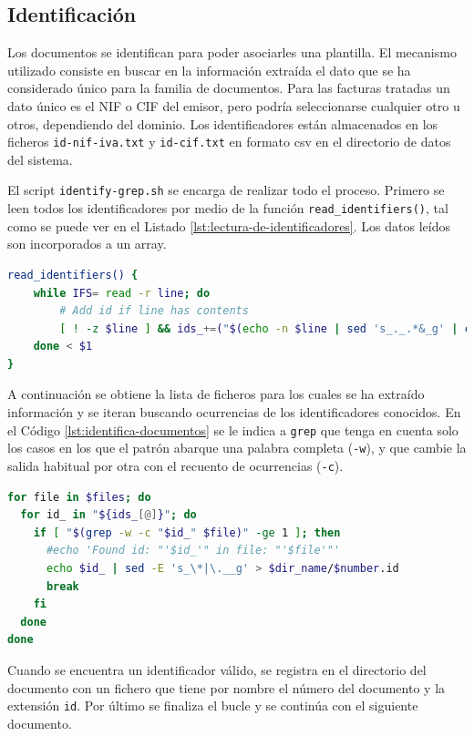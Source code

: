 \subsection{Identificación}
\label{subsec:impl-identificacion}

Los documentos se identifican para poder asociarles una plantilla. El mecanismo utilizado consiste en buscar en la información extraída el dato que se ha considerado único para la familia de documentos. Para las facturas tratadas un dato único es el NIF o CIF del emisor, pero podría seleccionarse cualquier otro u otros, dependiendo del dominio. Los identificadores están almacenados en los ficheros \verb|id-nif-iva.txt| y \verb|id-cif.txt| en formato \acrshort{csv} en el directorio de datos del sistema.

El script \verb|identify-grep.sh| se encarga de realizar todo el proceso. Primero se leen todos los identificadores por medio de la función \verb|read_identifiers()|, tal como se puede ver en el Listado \ref{lst:lectura-de-identificadores}. Los datos leídos son incorporados a un array.

\begin{lstlisting}[language=bash,caption={Lectura de identificadores},label=lst:lectura-de-identificadores]
read_identifiers() {
    while IFS= read -r line; do
        # Add id if line has contents
        [ ! -z $line ] && ids_+=("$(echo -n $line | sed 's_._.*&_g' | cut -c 3-)")
    done < $1
}
\end{lstlisting}

A continuación se obtiene la lista de ficheros para los cuales se ha extraído información y se iteran buscando ocurrencias de los identificadores conocidos. En el Código \ref{lst:identifica-documentos} se le indica a \verb|grep| que tenga en cuenta solo los casos en los que el patrón abarque una palabra completa (\verb|-w|), y que cambie la salida habitual por otra con el recuento de ocurrencias (\verb|-c|).

\begin{lstlisting}[language=bash,caption={Identificación de los documentos},label=lst:identifica-documentos]
for file in $files; do
  for id_ in "${ids_[@]}"; do
    if [ "$(grep -w -c "$id_" $file)" -ge 1 ]; then
      #echo 'Found id: "'$id_'" in file: "'$file'"'
      echo $id_ | sed -E 's_\*|\.__g' > $dir_name/$number.id
      break
    fi
  done
done
\end{lstlisting}

Cuando se encuentra un identificador válido, se registra en el directorio del documento con un fichero que tiene por nombre el número del documento y la extensión \verb|id|. Por último se finaliza el bucle y se continúa con el siguiente documento.

